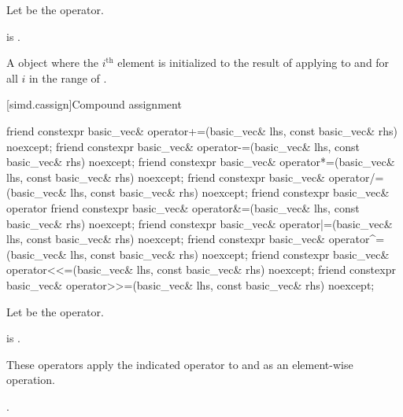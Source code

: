 \begin{itemdescr}
\pnum
Let  be the operator.

\pnum
\constraints
{} is .

\pnum
\returns
A  object where the $i^\text{th}$ element is initialized to
the result of applying  to  and  for all
$i$ in the range of .
\end{itemdescr}

[simd.cassign]{Compound assignment}

\begin{itemdecl}
friend constexpr basic_vec& operator+=(basic_vec& lhs, const basic_vec& rhs) noexcept;
friend constexpr basic_vec& operator-=(basic_vec& lhs, const basic_vec& rhs) noexcept;
friend constexpr basic_vec& operator*=(basic_vec& lhs, const basic_vec& rhs) noexcept;
friend constexpr basic_vec& operator/=(basic_vec& lhs, const basic_vec& rhs) noexcept;
friend constexpr basic_vec& operator%
friend constexpr basic_vec& operator&=(basic_vec& lhs, const basic_vec& rhs) noexcept;
friend constexpr basic_vec& operator|=(basic_vec& lhs, const basic_vec& rhs) noexcept;
friend constexpr basic_vec& operator^=(basic_vec& lhs, const basic_vec& rhs) noexcept;
friend constexpr basic_vec& operator<<=(basic_vec& lhs, const basic_vec& rhs) noexcept;
friend constexpr basic_vec& operator>>=(basic_vec& lhs, const basic_vec& rhs) noexcept;
\end{itemdecl}

\begin{itemdescr}
\pnum
Let  be the operator.

\pnum
\constraints
{} is
.

\pnum
\effects
These operators apply the indicated operator to  and  as
an element-wise operation.

\pnum
\returns
{}.
\end{itemdescr}

